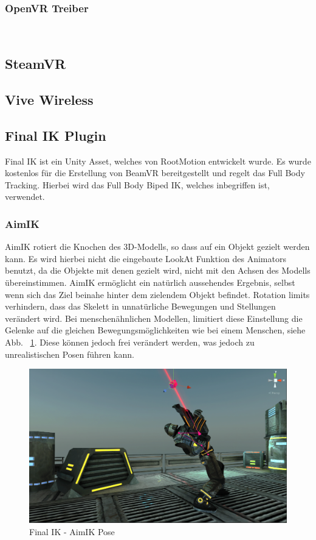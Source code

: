 \subsubsection{OpenVR Treiber}

~\cite{OpenVR_SteamWorks_Documentation_2020}


\subsection{SteamVR}

\subsection{Vive Wireless}

\subsection{Final IK Plugin}
Final IK ist ein Unity Asset, welches von RootMotion entwickelt wurde.
Es wurde kostenlos für die Erstellung von BeamVR bereitgestellt und regelt das Full Body Tracking.
Hierbei wird das Full Body Biped IK, welches inbegriffen ist, verwendet.
~\cite{FinalIK_Overview_2020}

\subsubsection{AimIK}
AimIK rotiert die Knochen des 3D-Modells, so dass auf ein Objekt gezielt werden kann.
Es wird hierbei nicht die eingebaute LookAt Funktion des Animators benutzt, da die Objekte mit denen gezielt wird, nicht mit den Achsen des Modells übereinstimmen.
AimIK ermöglicht ein natürlich aussehendes Ergebnis, selbst wenn sich das Ziel beinahe hinter dem zielendem Objekt befindet.
Rotation limits verhindern, dass das Skelett in unnatürliche Bewegungen und Stellungen verändert wird.
Bei menschenähnlichen Modellen, limitiert diese Einstellung die Gelenke auf die gleichen Bewegungsmöglichkeiten wie bei einem Menschen, siehe Abb. ~\ref{fig:finalIK_aimIK_pose}.
Diese können jedoch frei verändert werden, was jedoch zu unrealistischen Posen führen kann.
\begin {figure}
    \centering
    \includegraphics[scale=0.4]{pics/finalik_aimik_pose}
    \caption{Final IK - AimIK Pose}
    \label{fig:finalIK_aimIK_pose}
\end {figure}

